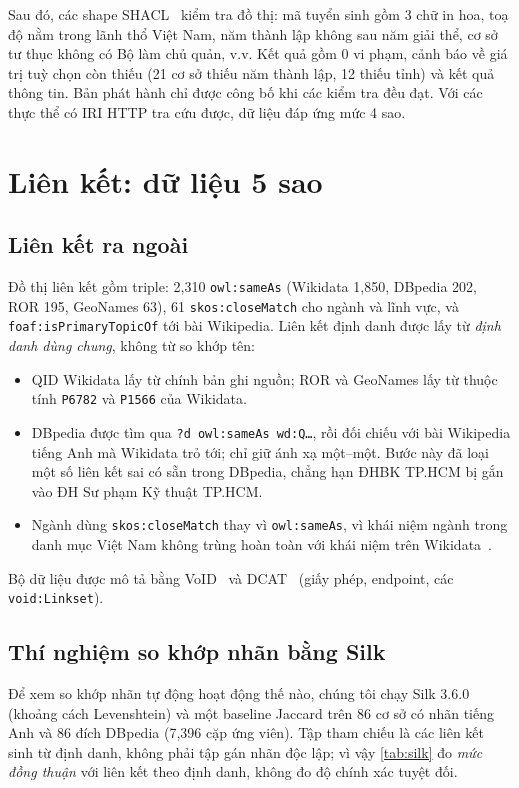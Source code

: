\documentclass[12pt,a4paper]{article}
\begin{document}
Sau đó, các shape SHACL~\cite{w3c2017shacl} kiểm tra đồ thị: mã tuyển sinh gồm 3 chữ in hoa, toạ độ nằm trong lãnh thổ
Việt Nam, năm thành lập không sau năm giải thể, cơ sở tư thục không có Bộ làm chủ quản, v.v. Kết quả gồm 0 vi phạm,
\metricWarnings{} cảnh báo về giá trị tuỳ chọn còn thiếu (21 cơ sở thiếu năm thành lập, 12 thiếu tỉnh) và
\metricInformationResults{} kết quả thông tin. Bản phát hành chỉ được công bố khi các kiểm tra đều đạt. Với các thực thể
có IRI HTTP tra cứu được, dữ liệu đáp ứng mức 4 sao.

\section{Liên kết: dữ liệu 5 sao}\label{sec:link}

\subsection{Liên kết ra ngoài}
Đồ thị liên kết gồm \metricLinkTriples{} triple: 2{,}310 \texttt{owl:sameAs} (Wikidata 1{,}850, DBpedia 202, ROR 195,
GeoNames 63), 61 \texttt{skos:closeMatch} cho ngành và lĩnh vực, và \texttt{foaf:isPrimaryTopicOf} tới bài Wikipedia.
Liên kết định danh được lấy từ \emph{định danh dùng chung}, không từ so khớp tên:
\begin{itemize}
  \item QID Wikidata lấy từ chính bản ghi nguồn; ROR và GeoNames lấy từ thuộc tính \texttt{P6782} và \texttt{P1566} của
  Wikidata.
  \item DBpedia được tìm qua \texttt{?d owl:sameAs wd:Q…}, rồi đối chiếu với bài Wikipedia tiếng Anh mà Wikidata trỏ tới;
  chỉ giữ ánh xạ một--một. Bước này đã loại một số liên kết sai có sẵn trong DBpedia, chẳng hạn ĐHBK TP.HCM bị gắn vào
  ĐH Sư phạm Kỹ thuật TP.HCM.
  \item Ngành dùng \texttt{skos:closeMatch} thay vì \texttt{owl:sameAs}, vì khái niệm ngành trong danh mục Việt Nam
  không trùng hoàn toàn với khái niệm trên Wikidata~\cite{halpin2010sameas}.
\end{itemize}
Bộ dữ liệu được mô tả bằng VoID~\cite{w3c2011void} và DCAT~\cite{w3c2020dcat} (giấy phép, endpoint, các
\texttt{void:Linkset}).

\subsection{Thí nghiệm so khớp nhãn bằng Silk}
Để xem so khớp nhãn tự động hoạt động thế nào, chúng tôi chạy Silk 3.6.0~\cite{volz2009silk} (khoảng cách Levenshtein)
và một baseline Jaccard trên 86 cơ sở có nhãn tiếng Anh và 86 đích DBpedia (7{,}396 cặp ứng viên). Tập tham chiếu là các
liên kết sinh từ định danh, không phải tập gán nhãn độc lập; vì vậy \cref{tab:silk} đo \emph{mức đồng thuận} với liên
kết theo định danh, không đo độ chính xác tuyệt đối.
\end{document}
